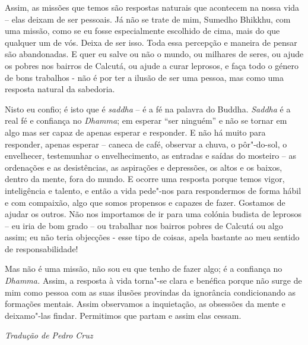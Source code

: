 Assim, as missões que temos são respostas naturais que acontecem na
nossa vida -- elas deixam de ser pessoais. Já não se trate de mim,
Sumedho Bhikkhu, com uma missão, como se eu fosse especialmente
escolhido de cima, mais do que qualquer um de vós. Deixa de ser isso.
Toda essa percepção e maneira de pensar são abandonadas. E quer eu salve
ou não o mundo, ou milhares de seres, ou ajude os pobres nos bairros de
Calcutá, ou ajude a curar leprosos, e faça todo o género de bons
trabalhos - não é por ter a ilusão de ser uma pessoa, mas como uma
resposta natural da sabedoria.

Nisto eu confio; é isto que é \emph{saddha} -- é a fé na palavra do
Buddha. \emph{Saddha} é a real fé e confiança no \emph{Dhamma}; em
esperar ``ser ninguém'' e não se tornar em algo mas ser capaz de apenas
esperar e responder. E não há muito para responder, apenas esperar --
caneca de café, observar a chuva, o pôr"-do-sol, o envelhecer,
testemunhar o envelhecimento, as entradas e saídas do mosteiro -- as
ordenações e as desistências, as aspirações e depressões, os altos e os
baixos, dentro da mente, fora do mundo. E ocorre uma resposta porque
temos vigor, inteligência e talento, e então a vida pede"-nos para
respondermos de forma hábil e com compaixão, algo que somos propensos e
capazes de fazer. Gostamos de ajudar os outros. Não nos importamos de ir
para uma colónia budista de leprosos -- eu iria de bom grado -- ou
trabalhar nos bairros pobres de Calcutá ou algo assim; eu não teria
objecções - esse tipo de coisas, apela bastante ao meu sentido de
responsabilidade!

Mas não é uma missão, não sou eu que tenho de fazer algo; é a confiança
no \emph{Dhamma.} Assim, a resposta à vida torna"-se clara e benéfica
porque não surge de mim como pessoa com as suas ilusões provindas da
ignorância condicionando as formações mentais. Assim observamos a
inquietação, as obsessões da mente e deixamo"-las findar. Permitimos que
partam e assim elas cessam.

\enlargethispage{2\baselineskip}

\vfill
{\raggedleft\itshape\small
  Tradução de Pedro Cruz
\par}
